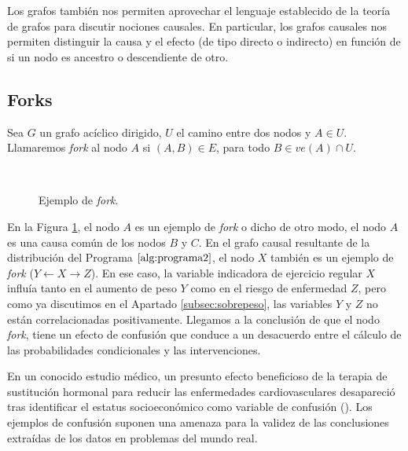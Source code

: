 \documentclass[oneside,openright,titlepage,numbers=noenddot,openany,headinclude,footinclude=true,
cleardoublepage=empty,abstractoff,BCOR=5mm,paper=a4,fontsize=12pt,main=spanish]{scrreprt}
\begin{document}
Los grafos también nos permiten aprovechar el lenguaje establecido de la teoría de grafos para discutir nociones causales. En particular, los grafos causales nos permiten distinguir la causa y el efecto (de tipo directo o indirecto) en función de si un nodo es ancestro o descendiente de otro.

\subsection{Forks}

\begin{definition} 
Sea $G$ un grafo acíclico dirigido, $U$ el camino entre dos nodos y $A\in U$. Llamaremos \textit{fork} al nodo $A$ si $(A,B)\in E$, para todo $B\in ve(A) \cap U$.
\end{definition}\

\begin{figure}[h]
\centering
{}
\caption{Ejemplo de \textit{fork}.}
\label{fig:fork}
\end{figure}

\clearpage

En la Figura \ref{fig:fork}, el nodo $A$ es un ejemplo de \textit{fork} o dicho de otro modo, el nodo $A$ es una causa común de los nodos $B$ y $C$. En el grafo causal resultante de la distribución del Programa $\ref{alg:programa2}$, el nodo $X$ también es un ejemplo de \textit{fork} ($Y \leftarrow X \to Z$). En ese caso, la variable indicadora de ejercicio regular $X$ influía tanto en el aumento de peso $Y$ como en el riesgo de enfermedad $Z$, pero como ya discutimos en el Apartado \ref{subsec:sobrepeso}, las variables $Y$ y $Z$ no están correlacionadas positivamente. Llegamos a la conclusión de que el nodo \textit{fork}, tiene un efecto de confusión que conduce a un desacuerdo entre el cálculo de las probabilidades condicionales y las intervenciones. 

\begin{example}
En un conocido estudio médico, un presunto efecto beneficioso de la terapia de sustitución hormonal para reducir las enfermedades cardiovasculares desapareció tras identificar el estatus socioeconómico como variable de confusión (\cite{ejconfusion2002}). Los ejemplos de confusión suponen una amenaza para la validez de las conclusiones extraídas de los datos en problemas del mundo real.
\end{example}
\end{document}
